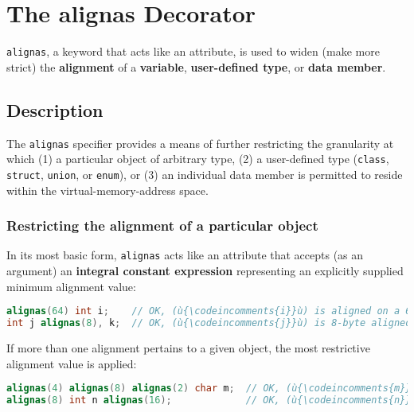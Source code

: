 \newpage
{}
\section[{\tt alignas}]{The {\SecCode alignas} Decorator}\label{alignas}


\texttt{alignas}, a keyword that acts like an attribute, is used to widen (make more strict)
the \textbf{alignment} of a \textbf{variable}, \textbf{user-defined
type}, or \textbf{data member}.

\subsection[Description]{Description}\label{description}

The \texttt{alignas} specifier provides a means of further restricting
the granularity at which (1) a particular object of arbitrary type, (2)
a user-defined type (\texttt{class}, \texttt{struct}, \texttt{union}, or
\texttt{enum}), or (3) an individual data member is permitted to reside
within the virtual-memory-address space.

\subsubsection[Restricting the alignment of a particular object]{Restricting the alignment of a particular object}\label{restricting-the-alignment-of-a-particular-object}

In its most basic form, \texttt{alignas} acts like an
attribute that accepts (as an argument) an
\textbf{integral constant expression} representing an explicitly
supplied minimum alignment value:

\begin{lstlisting}[language=C++]
alignas(64) int i;    // OK, (ù{\codeincomments{i}}ù) is aligned on a 64-byte address boundary.
int j alignas(8), k;  // OK, (ù{\codeincomments{j}}ù) is 8-byte aligned; (ù{\codeincomments{k}}ù) remains naturally aligned.
\end{lstlisting}

\noindent If more than one alignment pertains to a given object, the most
restrictive alignment value is applied:

\begin{lstlisting}[language=C++]
alignas(4) alignas(8) alignas(2) char m;  // OK, (ù{\codeincomments{m}}ù) is 8-byte aligned.
alignas(8) int n alignas(16);             // OK, (ù{\codeincomments{n}}ù) is 16-byte aligned.
\end{lstlisting}

